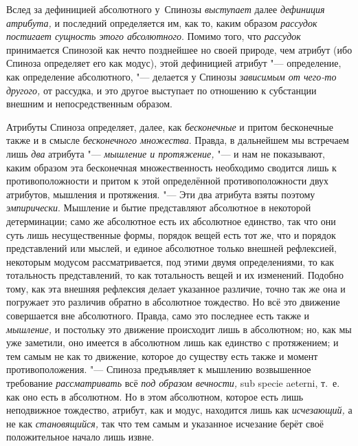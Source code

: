Вслед за дефиницией абсолютного у~Спинозы
{\em выступает} далее
{\em дефиниция атрибута,} и последний определяется им,
как то, каким образом {\em рассудок постигает сущность
этого
абсолютного}.
Помимо того, что {\em рассудок} принимается Спинозой
как нечто позднейшее но своей природе, чем атрибут (ибо Спиноза определяет
его как модус), этой дефиницией атрибут "--- определение, как определение
абсолютного, "--- делается у Спинозы {\em зависимым от
чего-то другого,} от рассудка, и это другое выступает по отношению к
субстанции внешним и непосредственным образом.

Атрибуты Спиноза определяет, далее, как
{\em бесконечные} и притом бесконечные также и в смысле
{\em бесконечного множества}. Правда, в дальнейшем мы
встречаем лишь {\em два} атрибута
"--- {\em мышление и протяжение,} "--- и нам не показывают,
каким образом эта бесконечная множественность необходимо сводится лишь к
противоположности и притом к этой определённой противоположности двух
атрибутов, мышления и протяжения. "--- Эти два атрибута взяты поэтому
{\em эмпирически}. Мышление и бытие представляют
абсолютное в некоторой детерминации; само же абсолютное есть их абсолютное
единство, так что они суть лишь несущественные формы, порядок вещей есть
тот же, что и порядок представлений или мыслей, и единое абсолютное только
внешней рефлексией, некоторым модусом рассматривается, под этими двумя
определениями, то как тотальность представлений, то как тотальность вещей и
их изменений. Подобно тому, как эта внешняя рефлексия делает указанное
различие, точно так же она и погружает это различив обратно в абсолютное
тождество. Но всё это движение совершается вне абсолютного. Правда, само
это последнее есть также и {\em мышление,} и постольку
это движение происходит лишь в абсолютном; но, как мы уже заметили, оно
имеется в абсолютном лишь как единство с протяжением; и тем самым не как то
движение, которое до существу есть также и момент противоположения. "---
Спиноза предъявляет к мышлению возвышенное требование
{\em рассматривать} всё {\em под
образом вечности,} sub specie aeterni, т.~е. как оно есть в абсолютном. Но
в этом абсолютном, которое есть лишь неподвижное тождество, атрибут, как и
модус, находится лишь как {\em исчезающий,} а не как
{\em становящийся,} так что тем самым и указанное
исчезание берёт своё положительное начало лишь извне.

